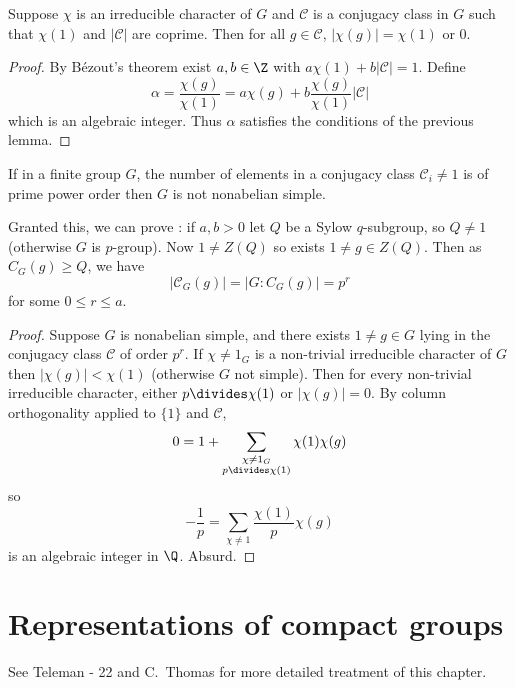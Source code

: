 \documentclass[a4paper]{article}
\newcommand{\ccl}{{\mathcal C}} %
\theoremstyle{definition}
\begin{document}
\begin{lemma}
  Suppose \(\chi\) is an irreducible character of \(G\) and \(\ccl\) is a conjugacy class in \(G\) such that \(\chi(1)\) and \(|\ccl|\) are coprime. Then for all \(g \in \ccl\), \(|\chi(g)| = \chi(1)\) or \(0\).
\end{lemma}

\begin{proof}
  By Bézout's theorem exist \(a, b \in \Z\) with \(a \chi(1) + b |\ccl| = 1\). Define
  \[
    \alpha = \frac{\chi(g)}{\chi(1)} = a \chi(g) + b \frac{\chi(g)}{\chi(1)} |\ccl|
    \]
    which is an algebraic integer. Thus \(\alpha\) satisfies the conditions of the previous lemma.
\end{proof}

\begin{proposition}
  If in a finite group \(G\), the number of elements in a conjugacy class \(\ccl_i \neq 1\) is of prime power order then \(G\) is not nonabelian simple.
\end{proposition}

Granted this, we can prove : if \(a, b > 0\) let \(Q\) be a Sylow \(q\)-subgroup, so \(Q \neq 1\) (otherwise \(G\) is \(p\)-group). Now \(1 \neq Z(Q)\) so exists \(1 \neq g \in Z(Q)\). Then as \(C_G(g) \geq Q\), we have
\[
  |\mathcal C_G(g)| = |G: C_G(g)| = p^r
\]
for some \(0 \leq r \leq a\).

\begin{proof}
  Suppose \(G\) is nonabelian simple, and there exists \(1 \neq g \in G\) lying in the conjugacy class \(\ccl\) of order \(p^r\). If \(\chi \neq 1_G\) is a non-trivial irreducible character of \(G\) then \(|\chi(g)| < \chi(1)\) (otherwise \(G\) not simple). Then for every non-trivial irreducible character, either \(p \divides \chi(1)\) or \(|\chi(g)| = 0\). By column orthogonality applied to \(\{1\}\) and \(\ccl\),
  \[
    0 = 1 + \sum_{\substack{\chi \neq 1_G \\ p \divides \chi(1)}} \chi(1) \chi(g)
  \]
  so
  \[
    -\frac{1}{p} = \sum_{\chi \neq 1} \frac{\chi(1)}{p} \chi(g)
  \]
  is an algebraic integer in \(\Q\). Absurd.
\end{proof}

\section{Representations of compact groups}

See Teleman  - 22 and C.\ Thomas  for more detailed treatment of this chapter.
\end{document}
